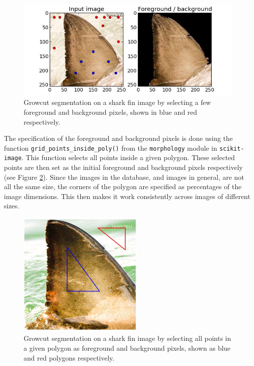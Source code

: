 \documentclass[a4paper,10pt]{article}
\begin{document}
\begin{figure}[H]
 \centering
 \includegraphics[width=5in]{segmentation.jpg}
 \caption{Growcut segmentation on a shark fin image by selecting a few
foreground and background pixels, shown in blue and red respectively.}
 \label{segmentation}
\end{figure}

The specification of
the foreground and background pixels is done using the function
\texttt{grid\_points\_inside\_poly()}\cite{scikit} from the \texttt{morphology} module in
\texttt{scikit-image}.  This function selects all points inside a given
polygon.  These selected  points are then set as the initial foreground and background pixels
respectively (see
Figure \ref{segmentation1}).
Since the images in the database, and images in general, are not
all the same size, the corners of the polygon are specified as percentages of the image dimensions.  
This then makes it work consistently across images of different sizes.  \\

\begin{figure}[H]
 \centering
 \includegraphics[width=2.4in]{polyshark.jpg}
 \caption{Growcut segmentation on a shark fin image by selecting all points in a
given polygon as foreground and background pixels, shown as blue and red
 polygons respectively.}
 \label{segmentation1}
\end{figure}
\end{document}
